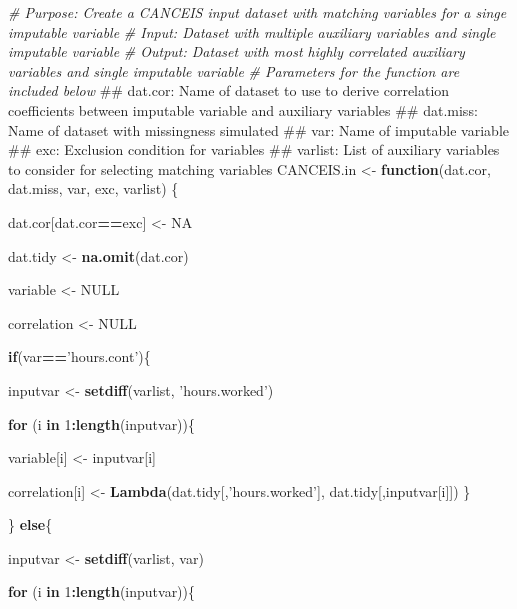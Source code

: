 \documentclass[]{book}
\newenvironment{Shaded}{\begin{snugshade}}{\end{snugshade}}
\newcommand{\KeywordTok}[1]{\textcolor[rgb]{0.13,0.29,0.53}{\textbf{#1}}}
\newcommand{\DecValTok}[1]{\textcolor[rgb]{0.00,0.00,0.81}{#1}}
\newcommand{\StringTok}[1]{\textcolor[rgb]{0.31,0.60,0.02}{#1}}
\newcommand{\CommentTok}[1]{\textcolor[rgb]{0.56,0.35,0.01}{\textit{#1}}}
\newcommand{\OtherTok}[1]{\textcolor[rgb]{0.56,0.35,0.01}{#1}}
\newcommand{\ControlFlowTok}[1]{\textcolor[rgb]{0.13,0.29,0.53}{\textbf{#1}}}
\newcommand{\OperatorTok}[1]{\textcolor[rgb]{0.81,0.36,0.00}{\textbf{#1}}}
\newcommand{\NormalTok}[1]{#1}
\begin{document}
\begin{Shaded}
\begin{Highlighting}[]
\CommentTok{# Purpose: Create a CANCEIS input dataset with matching variables for a singe imputable variable}
\CommentTok{# Input: Dataset with multiple auxiliary variables and single imputable variable }
\CommentTok{# Output: Dataset with most highly correlated auxiliary variables and single imputable variable}
\CommentTok{# Parameters for the function are included below}
\NormalTok{## dat.cor: Name of dataset to use to derive correlation coefficients between imputable variable and auxiliary variables}
\NormalTok{## dat.miss: Name of dataset with missingness simulated}
\NormalTok{## var: Name of imputable variable}
\NormalTok{## exc: Exclusion condition for variables}
\NormalTok{## varlist: List of auxiliary variables to consider for selecting matching variables}
\NormalTok{CANCEIS.in <-}\StringTok{ }\ControlFlowTok{function}\NormalTok{(dat.cor, dat.miss, var, exc, varlist) \{}

\NormalTok{  dat.cor[dat.cor}\OperatorTok{==}\NormalTok{exc] <-}\StringTok{ }\OtherTok{NA}
  
\NormalTok{  dat.tidy <-}\StringTok{ }\KeywordTok{na.omit}\NormalTok{(dat.cor)}
  
\NormalTok{  variable <-}\StringTok{ }\OtherTok{NULL}
  
\NormalTok{  correlation <-}\StringTok{ }\OtherTok{NULL}
  
  \ControlFlowTok{if}\NormalTok{(var}\OperatorTok{==}\StringTok{'hours.cont'}\NormalTok{)\{}
    
\NormalTok{    inputvar <-}\StringTok{ }\KeywordTok{setdiff}\NormalTok{(varlist, }\StringTok{'hours.worked'}\NormalTok{)}
    
    \ControlFlowTok{for}\NormalTok{ (i }\ControlFlowTok{in} \DecValTok{1}\OperatorTok{:}\KeywordTok{length}\NormalTok{(inputvar))\{}
      
\NormalTok{      variable[i] <-}\StringTok{ }\NormalTok{inputvar[i]}
      
\NormalTok{      correlation[i] <-}\StringTok{ }\KeywordTok{Lambda}\NormalTok{(dat.tidy[,}\StringTok{'hours.worked'}\NormalTok{], dat.tidy[,inputvar[i]])}
\NormalTok{      \}}
    
\NormalTok{    \} }\ControlFlowTok{else}\NormalTok{\{}
      
\NormalTok{      inputvar <-}\StringTok{ }\KeywordTok{setdiff}\NormalTok{(varlist, var)}
      
      \ControlFlowTok{for}\NormalTok{ (i }\ControlFlowTok{in} \DecValTok{1}\OperatorTok{:}\KeywordTok{length}\NormalTok{(inputvar))\{}
        

\end{Highlighting}
\end{Shaded}
\end{document}
